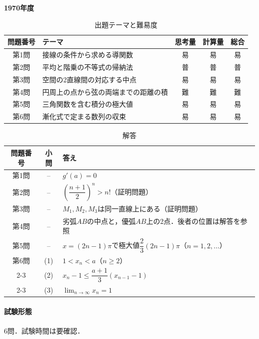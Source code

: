 \documentclass[../../main.tex]{subfiles}
\begin{document}
\begin{center}
  {\fontsize{48pt}{58pt}\selectfont \textbf{1970}\normalsize\textbf{年度}}
\end{center}

\begin{table}[htb]
  \centering
  \caption{出題テーマと難易度}
  \begin{tabular}{|c|p{6.2cm}|c|c|c|}
    \hline
    \textbf{問題番号} & \textbf{テーマ} & \textbf{思考量} & \textbf{計算量} & \textbf{総合} \\
    \hline
    第1問 & 接線の条件から求める導関数 & 易 & 易 & 易 \\
    \hline
    第2問 & 平均と階乗の不等式の帰納法 & 普 & 普 & 普 \\
    \hline
    第3問 & 空間の2直線間の対応する中点 & 易 & 易 & 易 \\
    \hline
    第4問 & 円周上の点から弦の両端までの距離の積 & 難 & 難 & 難 \\
    \hline
    第5問 & 三角関数を含む積分の極大値 & 易 & 易 & 易 \\
    \hline
    第6問 & 漸化式で定まる数列の収束 & 易 & 易 & 易 \\
    \hline
  \end{tabular}
\end{table}

\begin{table}[htb]
  \centering
  \caption{解答}
  \renewcommand{\arraystretch}{1.4}
  \begin{tabular}{|c|c|p{9cm}|}
    \hline
    \textbf{問題番号} & \textbf{小問} & \textbf{答え} \\
    \hline
    第1問 & -- & $g\prime(a)=0$ \\
    \hline
    第2問 & -- & $\left(\dfrac{n+1}{2}\right)^n>n!$（証明問題） \\
    \hline
    第3問 & -- & $M_1,M_2,M_3$は同一直線上にある（証明問題） \\
    \hline
    第4問 & -- & 劣弧$AB$の中点と，優弧$AB$上の2点．後者の位置は解答を参照 \\
    \hline
    第5問 & -- & $x=(2n-1)\pi$で極大値$\dfrac{2}{3}(2n-1)\pi$（$n=1,2,\ldots$） \\
    \hline
    第6問 & (1) & $1<x_n<a$（$n\ge2$） \\
    \cline{2-3}
    & (2) & $x_n-1\le\dfrac{a+1}{3}(x_{n-1}-1)$ \\
    \cline{2-3}
    & (3) & $\displaystyle\lim_{n\to\infty}x_n=1$ \\
    \hline
  \end{tabular}
\end{table}

\paragraph{試験形態}
6問．試験時間は要確認．
\end{document}

